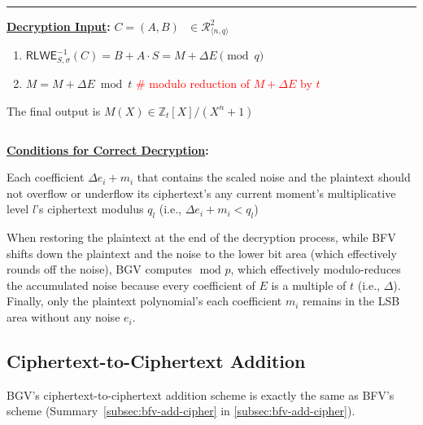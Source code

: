 \begin{tcolorbox}[title={\textbf{\tboxlabel{\ref*{subsec:bgv-enc-dec}} BGV Encryption and Decryption}}]
\par\noindent\rule{\textwidth}{0.4pt}

\textbf{\underline{Decryption Input}:} $C = (A, B) \text{ } \in \mathcal{R}_{\langle n,q \rangle}^2$

\begin{enumerate}
\item $\textsf{RLWE}^{-1}_{S,\sigma}(C) = B + A \cdot S  = M + \Delta E \pmod q$

\item $M = M + \Delta E \bmod t$ \textcolor{red}{ \# modulo reduction of $M + \Delta E$ by $t$}

\end{enumerate}

The final output is $M(X) \in \mathbb{Z}_t[X] / (X^n + 1)$

$ $

\textbf{\underline{Conditions for Correct Decryption}:}

Each coefficient $\Delta e_i + m_i$ that contains the scaled noise and the plaintext should not overflow or underflow its ciphertext's any current moment's multiplicative level $l$'s ciphertext modulus $q_l$ (i.e., $\Delta e_i + m_i < q_l$)

\end{tcolorbox}

When restoring the plaintext at the end of the decryption process, while BFV shifts down the plaintext and the noise to the lower bit area (which effectively rounds off the noise), BGV computes $\text{ mod } p$, which effectively modulo-reduces the accumulated noise because every coefficient of $E$ is a multiple of $t$ (i.e., $\Delta$). Finally, only the plaintext polynomial's each coefficient $m_i$ remains in the LSB area without any noise $e_i$. 


\subsection{Ciphertext-to-Ciphertext Addition}
\label{subsec:bgv-add-cipher}

BGV's ciphertext-to-ciphertext addition scheme is exactly the same as BFV's scheme (Summary~\ref*{subsec:bfv-add-cipher} in \autoref{subsec:bfv-add-cipher}). 


